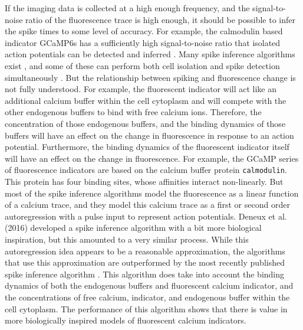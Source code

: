 If the imaging data is collected at a high enough frequency, and the signal-to-noise ratio of the fluorescence trace is high enough, it should be possible to infer the spike times to some level of accuracy. For example, the calmodulin based indicator GCaMP6s has a sufficiently high signal-to-noise ratio that isolated action potentials can be detected and inferred \parencite{chen}. Many spike inference algorithms exist \parencite{vogelstein, pnevmatikakis, friedrich, paninski1, paninski2, deneux, greenberg}, and some of these can perform both cell isolation and spike detection simultaneously \parencite{vogelstein, pnevmatikakis, paninski2, deneux}. But the relationship between spiking and fluorescence change is not fully understood. For example, the fluorescent indicator will act like an additional calcium buffer within the cell cytoplasm and will compete with the other endogenous buffers to bind with free calcium ions. Therefore, the concentration of those endogenous buffers, and the binding dynamics of those buffers will have an effect on the change in fluorescence in response to an action potential. Furthermore, the binding dynamics of the fluorescent indicator itself will have an effect on the change in fluorescence. For example, the GCaMP series of fluorescence indicators are based on the calcium buffer protein \texttt{calmodulin}. This protein has four binding sites, whose affinities interact non-linearly. But most of the spike inference algorithms model the fluorescence as a linear function of a calcium trace, and they model this calcium trace as a first or second order autoregression with a pulse input to represent action potentials. Deneux et al. (2016) developed a spike inference algorithm with a bit more biological inspiration, but this amounted to a very similar process. While this autoregression idea appears to be a reasonable approximation, the algorithms that use this approximation are outperformed by the most recently published spike inference algorithm \parencite{greenberg}. This algorithm does take into account the binding dynamics of both the endogenous buffers and fluorescent calcium indicator, and the concentrations of free calcium, indicator, and endogenous buffer within the cell cytoplasm. The performance of this algorithm shows that there is value in more biologically inspired models of fluorescent calcium indicators.

